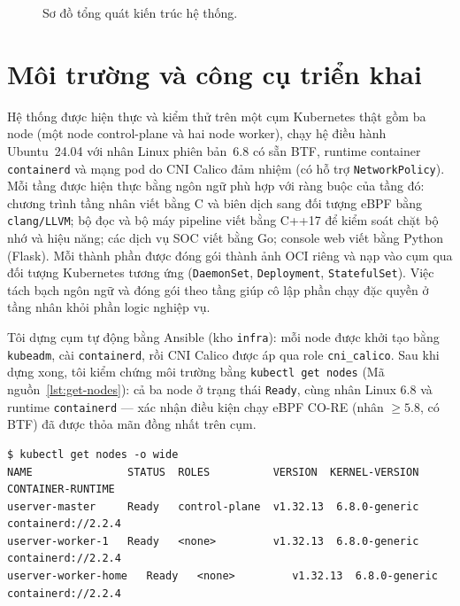 \begin{figure}[H]
  \centering
  \resizebox{\linewidth}{!}{}
  \caption{Sơ đồ tổng quát kiến trúc hệ thống.}
  \label{fig:arch-overview}
\end{figure}

\section{Môi trường và công cụ triển khai}
\label{sec:impl-env}

Hệ thống được hiện thực và kiểm thử trên một cụm Kubernetes thật gồm ba node (một
node control-plane và hai node worker), chạy hệ điều hành Ubuntu~24.04 với nhân Linux
phiên bản~6.8 có sẵn BTF, runtime container \texttt{containerd} và mạng pod do CNI
Calico đảm nhiệm (có hỗ trợ \texttt{NetworkPolicy}). Mỗi tầng được hiện thực bằng ngôn
ngữ phù hợp với ràng buộc của tầng đó: chương trình tầng nhân viết bằng C và biên dịch
sang đối tượng eBPF bằng \texttt{clang/LLVM}; bộ đọc và bộ máy pipeline viết bằng
C++17 để kiểm soát chặt bộ nhớ và hiệu năng; các dịch vụ SOC viết bằng Go; console
web viết bằng Python (Flask). Mỗi thành phần được đóng gói thành ảnh OCI riêng và nạp
vào cụm qua đối tượng Kubernetes tương ứng (\texttt{DaemonSet}, \texttt{Deployment},
\texttt{StatefulSet}). Việc tách bạch ngôn ngữ và đóng gói theo tầng giúp cô lập phần
chạy đặc quyền ở tầng nhân khỏi phần logic nghiệp vụ.

Tôi dựng cụm tự động bằng Ansible (kho \texttt{infra}): mỗi node được khởi tạo bằng
\texttt{kubeadm}, cài \texttt{containerd}, rồi CNI Calico được áp qua role
\texttt{cni\_calico}. Sau khi dựng xong, tôi kiểm chứng môi trường bằng
\texttt{kubectl get nodes} (Mã nguồn~\ref{lst:get-nodes}): cả ba node ở trạng thái
\texttt{Ready}, cùng nhân Linux 6.8 và runtime \texttt{containerd} --- xác nhận điều
kiện chạy eBPF CO-RE (nhân $\geq 5.8$, có BTF) đã được thỏa mãn đồng nhất trên cụm.

\begin{lstlisting}[language={},caption={Kiểm chứng cụm sau khi dựng bằng Ansible (kết quả \texttt{kubectl} rút gọn).},label={lst:get-nodes}]
$ kubectl get nodes -o wide
NAME               STATUS  ROLES          VERSION  KERNEL-VERSION    CONTAINER-RUNTIME
userver-master     Ready   control-plane  v1.32.13  6.8.0-generic     containerd://2.2.4
userver-worker-1   Ready   <none>         v1.32.13  6.8.0-generic     containerd://2.2.4
userver-worker-home   Ready   <none>         v1.32.13  6.8.0-generic     containerd://2.2.4
\end{lstlisting}

